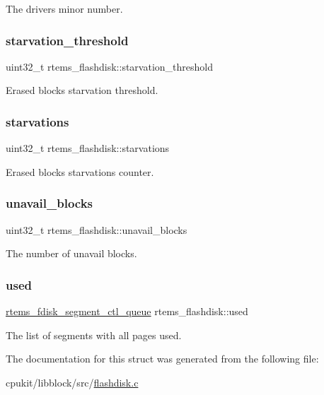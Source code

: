 The driver\textquotesingle{}s minor number. \mbox{\label{structrtems__flashdisk_acd944a0927630c553111d652de53a8cc}} 
\subsubsection{\texorpdfstring{starvation\_threshold}{starvation\_threshold}}
{\footnotesize\ttfamily uint32\+\_\+t rtems\+\_\+flashdisk\+::starvation\+\_\+threshold}

Erased blocks starvation threshold. \mbox{\label{structrtems__flashdisk_ae0faaafc879c7648666efcbf2dc0bc36}} 
\subsubsection{\texorpdfstring{starvations}{starvations}}
{\footnotesize\ttfamily uint32\+\_\+t rtems\+\_\+flashdisk\+::starvations}

Erased blocks starvations counter. \mbox{\label{structrtems__flashdisk_a638b619494771a304821684cc70be96c}} 
\subsubsection{\texorpdfstring{unavail\_blocks}{unavail\_blocks}}
{\footnotesize\ttfamily uint32\+\_\+t rtems\+\_\+flashdisk\+::unavail\+\_\+blocks}

The number of unavail blocks. \mbox{\label{structrtems__flashdisk_a2a733878720c975820498f017ff768ed}} 
\subsubsection{\texorpdfstring{used}{used}}
{\footnotesize\ttfamily \mbox{\hyperlink{structrtems__fdisk__segment__ctl__queue}{rtems\+\_\+fdisk\+\_\+segment\+\_\+ctl\+\_\+queue}} rtems\+\_\+flashdisk\+::used}

The list of segments with all pages used. 

The documentation for this struct was generated from the following file\+:\begin{DoxyCompactItemize}
\item 
cpukit/libblock/src/\mbox{\hyperlink{flashdisk_8c}{flashdisk.\+c}}\end{DoxyCompactItemize}
